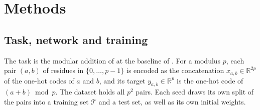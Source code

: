 \documentclass[a4paper,11pt]{article} %
\begin{document}
\section{Methods}

\subsection{Task, network and training}

The task is the modular addition of \citet{gromovGrokkingModularArithmetic2023}
at the baseline of \citet{kumarGrokkingTransitionLazy2024}. For a modulus $p$,
each pair $(a,b)$ of residues in $\{0,\dots,p-1\}$ is encoded as the
concatenation $x_{a,b}\in\mathbb{R}^{2p}$ of the one-hot codes of $a$ and $b$,
and its target $y_{a,b}\in\mathbb{R}^{p}$ is the one-hot code of
$(a+b) \bmod p$. The dataset holds all $p^2$ pairs. Each seed draws its own
split of the pairs into a training set $\mathcal{T}$ and a test set, as well as
its own initial weights.
\end{document}
